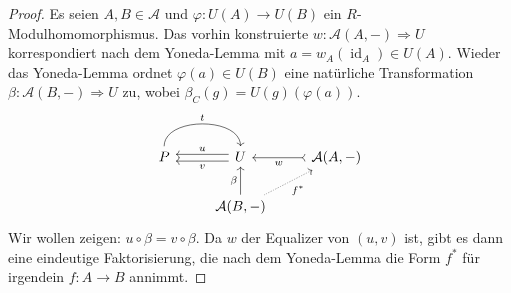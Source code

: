 \documentclass[a4paper, parskip=half,11pt]{scrartcl}
\theoremstyle{marginbreak}
\theoremstyle{nonumberplain}
\newtheorem{proof}{Beweis.}
\newcommand\cat\mathcal
\newcommand{\n}{\pgfmatrixnextcell}
\newcommand\nat\Rightarrow
\DeclareMathOperator{\id}{id}
\begin{document}
{\begin{proof}
			Es seien $A, B\in\cat{A}$ und $\varphi\colon U(A)\to U(B)$ ein
			$R$-Modulhomomorphismus. Das vorhin konstruierte $w\colon \cat{A}(A,{-})\nat U$
			korrespondiert nach dem Yoneda-Lemma mit $a = w_A(\id_A)\in U(A)$.
			Wieder das Yoneda-Lemma ordnet $\varphi(a)\in U(B)$ eine natürliche
			Transformation $\beta\colon\cat{A}(B,{-})\nat U$ zu, wobei
			$\beta_C(g) = U(g)(\varphi(a))$.
			\[
				\begin{tikzcd}
					P
						\ar[bend left=90]{r}{t} \n
					U
						\ar[shift right,']{l}{u}
						\ar[shift left]{l}{v} \n
					\cat{A}(A,{-})
						\ar[tail]{l}{w} \\ \n
					\cat{A}(B,{-})
						\ar{u}{\beta}
						\ar[densely dotted, ']{ru}{f^*}
				\end{tikzcd}
			\]
			Wir wollen zeigen: $u\circ\beta=v\circ\beta$. Da $w$ der Equalizer
			von $(u, v)$ ist, gibt es dann eine eindeutige Faktorisierung, die nach
			dem Yoneda-Lemma die Form $f^*$ für irgendein $f\colon A\to B$ annimmt.


\end{proof}}
\end{document}

